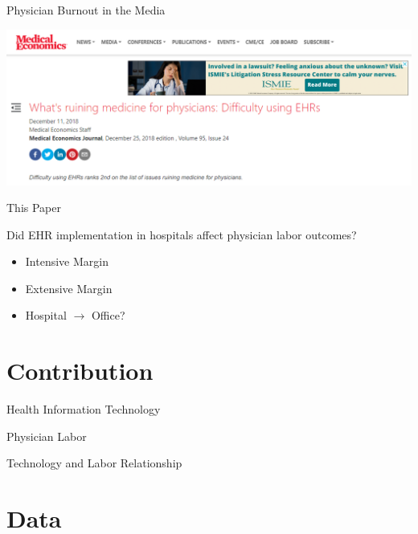 \documentclass[10pt]{beamer}
\begin{document}
\begin{frame}[noframenumbering]{Physician Burnout in the Media}
\begin{center}
    \includegraphics[scale=.45]{graphics/News Clip3.PNG}
\end{center}
\end{frame}

\begin{frame}{This Paper}

Did EHR implementation in hospitals affect physician labor outcomes?
\begin{itemize}
    \item Intensive Margin
    \item Extensive Margin
    \item Hospital $\rightarrow$ Office?
\end{itemize}
    
\end{frame}


\section{Contribution}

\begin{frame}{Health Information Technology}
    
\end{frame}

\begin{frame}{Physician Labor}
    
\end{frame}

\begin{frame}{Technology and Labor Relationship}
    
\end{frame}



\section{Data}
\end{document}
